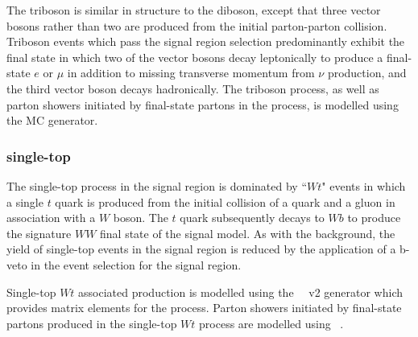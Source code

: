 The triboson is similar in structure to the diboson, except that three vector bosons rather than two are produced from the initial parton-parton collision. Triboson events which pass the signal region selection predominantly exhibit the final state in which two of the vector bosons decay leptonically to produce a final-state \(e\) or \(\mu\) in addition to missing transverse momentum from \(\nu\) production, and the third vector boson decays hadronically.  The triboson process, as well as parton showers initiated by final-state partons in the process, is modelled using the \SHERPA[2.2] MC generator. 

\subsubsection{single-top}
\label{sec:stop_description}

The single-top process in the signal region is dominated by ``\(Wt\)" events \cite{stopWt} in which a single \(t\) quark is produced from the initial collision of a quark and a gluon in association with a \(W\) boson. The \(t\) quark subsequently decays to \(Wb\) to produce the signature \(WW\) final state of the signal model. As with the \ttbar background, the yield of single-top events in the signal region is reduced by the application of a b-veto in the event selection for the signal region.    

Single-top \(Wt\) associated production is modelled using the \POWHEGBOX~\cite{Re:2010bp,Nason:2004rx,Frixione:2007vw,Alioli:2010xd}~v2 generator which provides matrix elements for the process. Parton showers initiated by final-state partons produced in the single-top \(Wt\) process are modelled using ~\cite{Sjostrand:2014zea}. 

